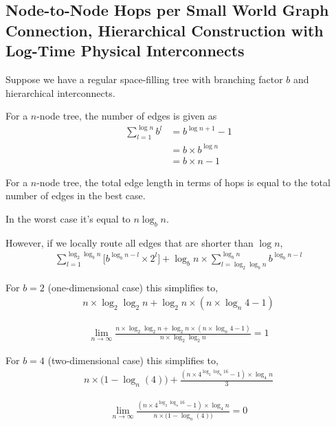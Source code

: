 \subsection{Node-to-Node Hops per Small World Graph Connection, Hierarchical Construction with Log-Time Physical Interconnects}

Suppose we have a regular space-filling tree with branching factor $b$ and hierarchical interconnects.

For a $n$-node tree, the number of edges is given as
\begin{align*}
\sum_{l = 1}^{\log n} b^{l}
&= b^{\log n + 1} - 1 \\
&= b \times b^{\log n} \\
&= b \times n - 1
\end{align*}

For a $n$-node tree, the total edge length in terms of hops is equal to the total number of edges in the best case.

In the worst case it's equal to $n \log_b n$.

However, if we locally route all edges that are shorter than $\log n$,
\begin{align*}
\sum_{l = 1}^{\log_2 \log_b n} %
\Big[
  b^{\log_b n - l} %
  \times
  2^l %
\Big]
+
\log_b n %
\times
\sum_{l = \log_2 \log_b n }^{ \log_b n} %
b^{\log_b n - l}
\end{align*}

For $b = 2$ (one-dimensional case) this simplifies to,
\begin{align*}
n \times \log_2 \log_2 n
+
\log_2 n \times (n \times \log_n 4 - 1)
\end{align*}

\begin{align*}
\lim_{n \rightarrow \infty}
\frac{
  n \times \log_2 \log_2 n
  +
  \log_2 n \times (n \times \log_n 4 - 1)
}{
  n \times \log_2 \log_2 n
}
= 1
\end{align*}

For $b = 4$ (two-dimensional case) this simplifies to,
\begin{align*}
n \times \Big( 1 - \log_n(4) \Big)
+
\frac{
  (
    n \times 4^{
      \log_2 \log_n 16
    } - 1
  ) \times \log_4 n
}{3}
\end{align*}

\begin{align*}
\lim_{n \rightarrow \infty}
\frac{   (     n \times 4^{       \log_2 \log_n 16     } - 1   ) \times \log_4 n }{n \times \Big( 1 - \log_n(4) \Big)} = 0
\end{align*}

